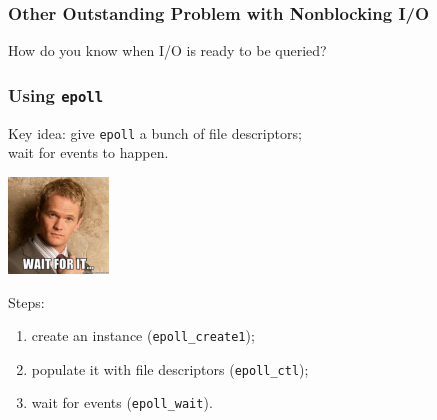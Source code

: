 \begin{frame}
  \frametitle{Other Outstanding Problem with Nonblocking I/O}

    How do you know when I/O is ready to be queried?


\end{frame}

\begin{frame}
  \frametitle{Using {\tt epoll}}
  
    Key idea: give {\tt epoll} a bunch of file descriptors;\\
     \hspace*{2em}wait for events to happen.\\[1em]

\begin{center}
	\includegraphics[width=0.2\textwidth]{images/waitforit.jpg}
\end{center}

     Steps:
     \begin{enumerate}
       \item create an instance ({\tt epoll\_create1});
       \item populate it with file descriptors ({\tt epoll\_ctl});
       \item wait for events ({\tt epoll\_wait}).
     \end{enumerate}
  
\end{frame}

